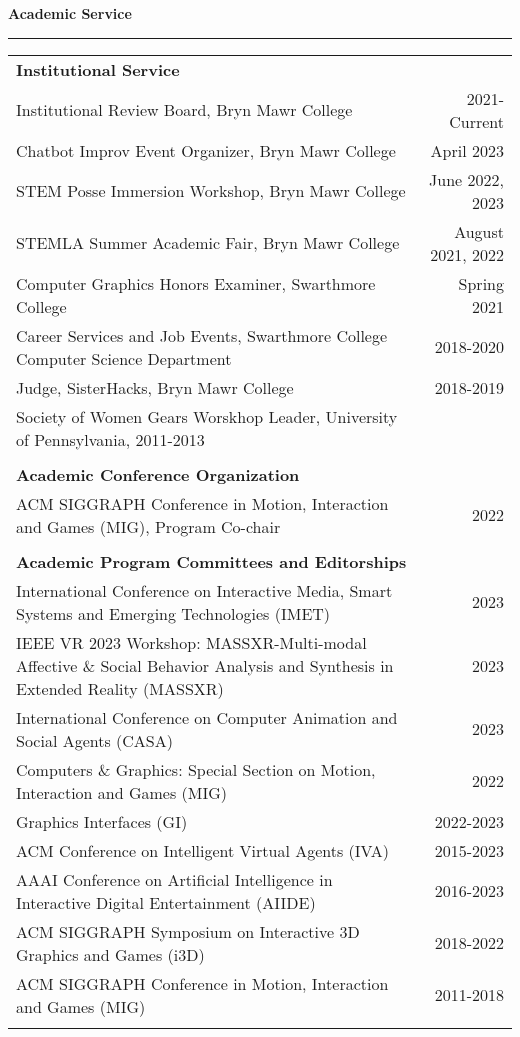\needspace{6em}
{\large {\bf Academic Service}}
\vspace{0.1cm}
\hrule
\medskip
\begin{tabular*}{7.1in}{@{}l@{\extracolsep\fill}r}

{\bf Institutional Service } & \\
Institutional Review Board, Bryn Mawr College & 2021-Current \\
Chatbot Improv Event Organizer, Bryn Mawr College & April 2023 \\
STEM Posse Immersion Workshop, Bryn Mawr College & June 2022, 2023 \\
STEMLA Summer Academic Fair, Bryn Mawr College & August 2021, 2022 \\
Computer Graphics Honors Examiner, Swarthmore College & Spring 2021 \\
Career Services and Job Events, Swarthmore College Computer Science Department & 2018-2020 \\
Judge, SisterHacks, Bryn Mawr College & 2018-2019 \\
Society of Women Gears Worskhop Leader, University of Pennsylvania, 2011-2013 \\
\phantom{yommomma} & \phantom{2002}\\

{\bf Academic Conference Organization } & \\
ACM SIGGRAPH Conference in Motion, Interaction and Games (MIG), Program Co-chair & 2022 \\
\phantom{yommomma} & \phantom{2002}\\

{\bf Academic Program Committees and Editorships} & \\
International Conference on Interactive Media, Smart Systems and Emerging Technologies (IMET)& 2023\\
IEEE VR 2023 Workshop: MASSXR-Multi-modal Affective \& Social Behavior Analysis and Synthesis in Extended Reality (MASSXR)& 2023\\
International Conference on Computer Animation and Social Agents (CASA)& 2023 \\
Computers \& Graphics: Special Section on Motion, Interaction and Games (MIG)& 2022 \\
Graphics Interfaces (GI)& 2022-2023 \\
ACM Conference on Intelligent Virtual Agents (IVA)& 2015-2023\\
AAAI Conference on Artificial Intelligence in Interactive Digital Entertainment (AIIDE)& 2016-2023 \\
ACM SIGGRAPH Symposium on Interactive 3D Graphics and Games (i3D)& 2018-2022 \\
ACM SIGGRAPH Conference in Motion, Interaction and Games (MIG)& 2011-2018 \\
\phantom{yommomma} & \phantom{2002}\\


\end{tabular*}
